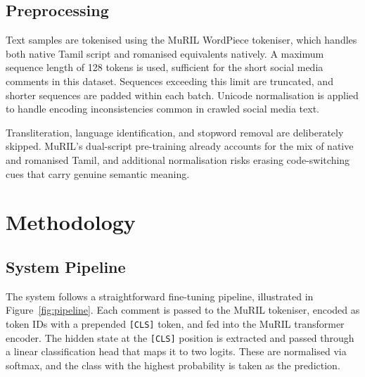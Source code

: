\documentclass[11pt]{article}
\begin{document}
\subsection{Preprocessing}

Text samples are tokenised using the MuRIL WordPiece tokeniser, which handles both native Tamil
script and romanised equivalents natively. A maximum sequence length of 128 tokens is used, sufficient for the short social media comments in this
dataset. Sequences exceeding this limit are truncated, and shorter sequences are padded within
each batch. Unicode normalisation is applied
to handle encoding inconsistencies common in
crawled social media text.

Transliteration, language identification, and stopword removal are deliberately skipped. MuRIL's
dual-script pre-training already accounts for the
mix of native and romanised Tamil, and additional
normalisation risks erasing code-switching cues
that carry genuine semantic meaning.

\section{Methodology}

\subsection{System Pipeline}

The system follows a straightforward fine-tuning
pipeline, illustrated in Figure~\ref{fig:pipeline}. Each comment
is passed to the MuRIL tokeniser, encoded as token IDs with a prepended \texttt{[CLS]} token, and fed
into the MuRIL transformer encoder. The hidden
state at the \texttt{[CLS]} position is extracted and passed
through a linear classification head that maps it to
two logits. These are normalised via softmax, and
the class with the highest probability is taken as the
prediction.
\end{document}
